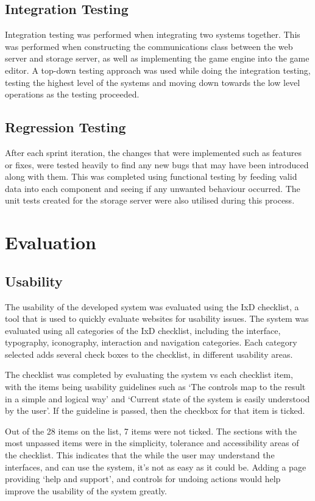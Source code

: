 	\subsection{Integration Testing}
	Integration testing was performed when integrating two systems together. This was performed when constructing the communications class between the web server and storage server, as well as implementing the game engine into the game editor. A top-down testing approach was used while doing the integration testing, testing the highest level of the systems and moving down towards the low level operations as the testing proceeded.

	\subsection{Regression Testing}
	After each sprint iteration, the changes that were implemented such as features or fixes, were tested heavily to find any new bugs that may have been introduced along with them. This was completed using functional testing by feeding valid data into each component and seeing if any unwanted behaviour occurred. The unit tests created for the storage server were also utilised during this process.

\section{Evaluation}
	\subsection{Usability}
	The usability of the developed system was evaluated using the IxD checklist, a tool that is used to quickly evaluate websites for usability issues. The system was evaluated using all categories of the IxD checklist, including the interface, typography, iconography, interaction and navigation categories.\cite{ixdchecklist} Each category selected adds several check boxes to the checklist, in different usability areas.

	The checklist was completed by evaluating the system vs each checklist item, with the items being usability guidelines such as `The controls map to the result in a simple and logical way' and `Current state of the system is easily understood by the user'.\cite{ixdchecklist} If the guideline is passed, then the checkbox for that item is ticked.

	Out of the 28 items on the list, 7 items were not ticked. The sections with the most unpassed items were in the simplicity, tolerance and accessibility areas of the checklist. This indicates that the while the user may understand the interfaces, and can use the system, it's not as easy as it could be. Adding a page providing `help and support', and controls for undoing actions would help improve the usability of the system greatly.

